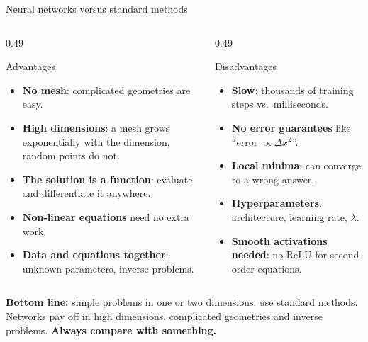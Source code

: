 \documentclass[10pt,aspectratio=169]{beamer}
\begin{document}
\begin{frame}{Neural networks versus standard methods}
\begin{columns}[T]
\begin{column}{0.49\textwidth}
\begin{block}{Advantages}
\small
\begin{itemize}
  \item \textbf{No mesh}: complicated geometries are easy.
  \item \textbf{High dimensions}: a mesh grows exponentially with the
        dimension, random points do not.
  \item \textbf{The solution is a function}: evaluate and differentiate it
        anywhere.
  \item \textbf{Non-linear equations} need no extra work.
  \item \textbf{Data and equations together}: unknown parameters, inverse
        problems.
\end{itemize}
\end{block}
\end{column}
\begin{column}{0.49\textwidth}
\begin{block}{Disadvantages}
\small
\begin{itemize}
  \item \textbf{Slow}: thousands of training steps vs.\ milliseconds.
  \item \textbf{No error guarantees} like ``error $\propto\Delta x^{2}$''.
  \item \textbf{Local minima}: can converge to a wrong answer.
  \item \textbf{Hyperparameters}: architecture, learning rate,
        $\lambda$.
  \item \textbf{Smooth activations needed}: no ReLU for second-order
        equations.
\end{itemize}
\end{block}
\end{column}
\end{columns}
\vspace{6pt}
\textbf{Bottom line:} simple problems in one or two dimensions: use
standard methods.  Networks pay off in high dimensions, complicated
geometries and inverse problems.  \textbf{Always compare with something.}
\end{frame}
\end{document}
